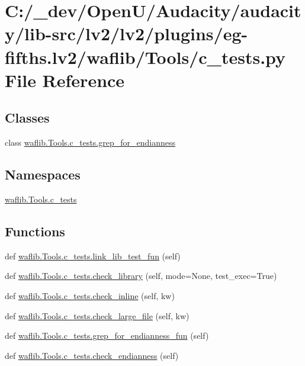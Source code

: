 \hypertarget{lv2_2plugins_2eg-fifths_8lv2_2waflib_2_tools_2c__tests_8py}{}\section{C\+:/\+\_\+dev/\+Open\+U/\+Audacity/audacity/lib-\/src/lv2/lv2/plugins/eg-\/fifths.lv2/waflib/\+Tools/c\+\_\+tests.py File Reference}
\label{lv2_2plugins_2eg-fifths_8lv2_2waflib_2_tools_2c__tests_8py}
\subsection*{Classes}
\begin{DoxyCompactItemize}
\item 
class \hyperlink{classwaflib_1_1_tools_1_1c__tests_1_1grep__for__endianness}{waflib.\+Tools.\+c\+\_\+tests.\+grep\+\_\+for\+\_\+endianness}
\end{DoxyCompactItemize}
\subsection*{Namespaces}
\begin{DoxyCompactItemize}
\item 
 \hyperlink{namespacewaflib_1_1_tools_1_1c__tests}{waflib.\+Tools.\+c\+\_\+tests}
\end{DoxyCompactItemize}
\subsection*{Functions}
\begin{DoxyCompactItemize}
\item 
def \hyperlink{namespacewaflib_1_1_tools_1_1c__tests_a58fcfbe9b3ba09e1a057dc1276435776}{waflib.\+Tools.\+c\+\_\+tests.\+link\+\_\+lib\+\_\+test\+\_\+fun} (self)
\item 
def \hyperlink{namespacewaflib_1_1_tools_1_1c__tests_a6769fa909685b6d42bde7746f3e59a64}{waflib.\+Tools.\+c\+\_\+tests.\+check\+\_\+library} (self, mode=None, test\+\_\+exec=True)
\item 
def \hyperlink{namespacewaflib_1_1_tools_1_1c__tests_a8c36c48a71d56e13d6a7973972ef7fb8}{waflib.\+Tools.\+c\+\_\+tests.\+check\+\_\+inline} (self, kw)
\item 
def \hyperlink{namespacewaflib_1_1_tools_1_1c__tests_ac29778f60925677c62b37a4da6a94322}{waflib.\+Tools.\+c\+\_\+tests.\+check\+\_\+large\+\_\+file} (self, kw)
\item 
def \hyperlink{namespacewaflib_1_1_tools_1_1c__tests_a94db04af071d40c6a2b181ae0925389c}{waflib.\+Tools.\+c\+\_\+tests.\+grep\+\_\+for\+\_\+endianness\+\_\+fun} (self)
\item 
def \hyperlink{namespacewaflib_1_1_tools_1_1c__tests_a83231aa06753183ca283a2d9b4cf39ce}{waflib.\+Tools.\+c\+\_\+tests.\+check\+\_\+endianness} (self)
\end{DoxyCompactItemize}
